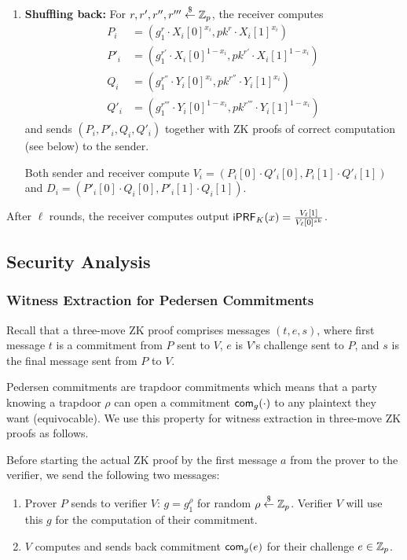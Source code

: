 \begin{enumerate}
\item {\bf Shuffling back:}
  For $r,r',r'',r'''\stackrel{\$}{\leftarrow}\mathbb{Z}_p$, the receiver computes
  \begin{align*}
    P_i&=(g_1^r\cdot{}X_i[0]^{x_i},pk^r\cdot{}X_i[1]^{x_i})
    \\P'_i&=(g_1^{r'}\cdot{}X_i[0]^{1-x_i},pk^{r'}\cdot{}X_i[1]^{1-x_i})
   \\Q_i&=(g_1^{r''}\cdot{}Y_i[0]^{x_i},pk^{r''}\cdot{}Y_i[1]^{x_i})
   \\Q'_i&=(g_1^{r'''}\cdot{}Y_i[0]^{1-x_i},pk^{r'''}\cdot{}Y_i[1]^{1-x_i})
  \end{align*} 
  and sends $(P_i,P'_i,Q_i,Q'_i)$ together with ZK proofs of correct
  computation (see below) to the sender.

  Both sender and receiver compute
  $V_i=(P_i[0]\cdot{}Q'_i[0],P_i[1]\cdot{}Q'_i[1])$ and
  $D_i=(P'_i[0]\cdot{}Q_i[0],P'_i[1]\cdot{}Q_i[1])$.
  
\end{enumerate}

After $\ell$ rounds, the receiver computes output
$\mathsf{i}\mathsf{PRF}_K(x)=\frac{V_\ell[1]}{V_{\ell}[0]^{sk}}$.


\subsection{Security Analysis}
 

\subsubsection{Witness Extraction for Pedersen Commitments}
Recall that a three-move ZK proof comprises messages $(t,e,s)$, where
first message $t$ is a commitment from $P$ sent to $V$, $e$ is $V$'s
challenge sent to $P$, and $s$ is the final message sent from $P$ to
$V$.

Pedersen commitments are trapdoor commitments which means that a party
knowing a trapdoor $\rho$ can open a commitment $\mathsf{com}_g(\cdot)$ to any
plaintext they want (equivocable).  We use this property for witness
extraction in three-move ZK proofs as follows.

Before starting the actual ZK proof by the first message $a$ from the
prover to the verifier, we send the following two messages:
\begin{enumerate}
\item Prover $P$ sends to verifier $V$: $g=g_1^\rho$ for random
  $\rho\stackrel{\$}{\leftarrow}\mathbb{Z}_p$. Verifier $V$ will use this $g$ for the computation
  of their commitment.
  \item $V$ computes and sends back commitment $\mathsf{com}_g(e)$ for their
    challenge $e\in\mathbb{Z}_p$.
\end{enumerate}

